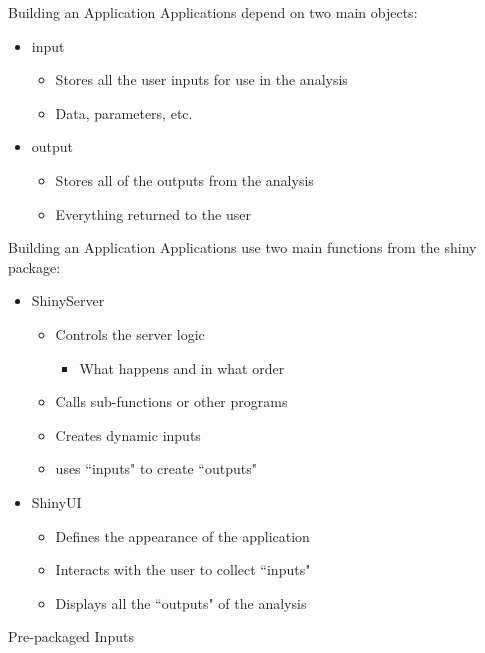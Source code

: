 \documentclass{beamer}\usepackage[]{graphicx}\usepackage[]{color}
\begin{document}
\begin{frame}{Building an Application}
Applications depend on two main objects:
\bigskip
\begin{itemize}
\item input
  \begin{itemize}
  \item Stores all the user inputs for use in the analysis
  \item Data, parameters, etc.
  \end{itemize}
\pause
\bigskip
\item output
  \begin{itemize}
  \item Stores all of the outputs from the analysis
  \item Everything returned to the user
  \end{itemize}
\end{itemize}
\end{frame}

\begin{frame}{Building an Application}
Applications use two main functions from the shiny package:
\bigskip
\begin{itemize}
\item ShinyServer
  \begin{itemize}
  \item Controls the server logic
    \begin{itemize}
    \item What happens and in what order
    \end{itemize}
  \item Calls sub-functions or other programs
  \item Creates dynamic inputs
  \item uses ``inputs" to create ``outputs"
  \end{itemize}
\pause
\bigskip
\item ShinyUI
  \begin{itemize}
  \item Defines the appearance of the application
  \item Interacts with the user to collect ``inputs"
  \item Displays all the ``outputs" of the analysis
  \end{itemize}
\end{itemize}
\end{frame}

\begin{frame}{Pre-packaged Inputs}

\end{frame}
\end{document}
